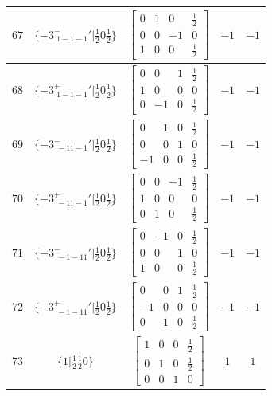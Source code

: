 \documentclass[fleqn,8pt]{jsarticle}
\begin{document}
\begin{longtable}{ccccc}
$ 67 $ & $ \{-3^{-}_{\,\,1-1-1}{}'|\frac{1}{2} 0 \frac{1}{2}\} $ & $ \begin{bmatrix} 0 & 1 & 0 & \frac{1}{2} \\ 0 & 0 & -1 & 0 \\ 1 & 0 & 0 & \frac{1}{2} \end{bmatrix} $ & $ -1 $ & $ -1 $ \\ \hline
$ 68 $ & $ \{-3^{+}_{\,\,1-1-1}{}'|\frac{1}{2} 0 \frac{1}{2}\} $ & $ \begin{bmatrix} 0 & 0 & 1 & \frac{1}{2} \\ 1 & 0 & 0 & 0 \\ 0 & -1 & 0 & \frac{1}{2} \end{bmatrix} $ & $ -1 $ & $ -1 $ \\ \hline
$ 69 $ & $ \{-3^{-}_{\,\,-11-1}{}'|\frac{1}{2} 0 \frac{1}{2}\} $ & $ \begin{bmatrix} 0 & 1 & 0 & \frac{1}{2} \\ 0 & 0 & 1 & 0 \\ -1 & 0 & 0 & \frac{1}{2} \end{bmatrix} $ & $ -1 $ & $ -1 $ \\ \hline
$ 70 $ & $ \{-3^{+}_{\,\,-11-1}{}'|\frac{1}{2} 0 \frac{1}{2}\} $ & $ \begin{bmatrix} 0 & 0 & -1 & \frac{1}{2} \\ 1 & 0 & 0 & 0 \\ 0 & 1 & 0 & \frac{1}{2} \end{bmatrix} $ & $ -1 $ & $ -1 $ \\ \hline
$ 71 $ & $ \{-3^{-}_{\,\,-1-11}{}'|\frac{1}{2} 0 \frac{1}{2}\} $ & $ \begin{bmatrix} 0 & -1 & 0 & \frac{1}{2} \\ 0 & 0 & 1 & 0 \\ 1 & 0 & 0 & \frac{1}{2} \end{bmatrix} $ & $ -1 $ & $ -1 $ \\ \hline
$ 72 $ & $ \{-3^{+}_{\,\,-1-11}{}'|\frac{1}{2} 0 \frac{1}{2}\} $ & $ \begin{bmatrix} 0 & 0 & 1 & \frac{1}{2} \\ -1 & 0 & 0 & 0 \\ 0 & 1 & 0 & \frac{1}{2} \end{bmatrix} $ & $ -1 $ & $ -1 $ \\ \hline
$ 73 $ & $ \{1|\frac{1}{2} \frac{1}{2} 0\} $ & $ \begin{bmatrix} 1 & 0 & 0 & \frac{1}{2} \\ 0 & 1 & 0 & \frac{1}{2} \\ 0 & 0 & 1 & 0 \end{bmatrix} $ & $ 1 $ & $ 1 $ \\ \hline

\end{longtable}
\end{document}
